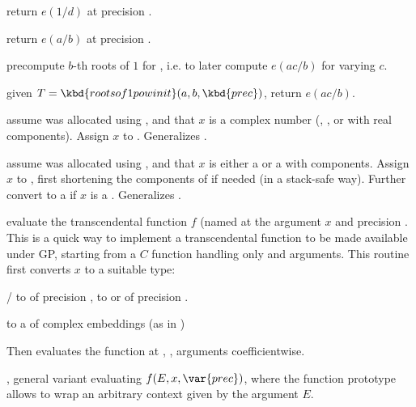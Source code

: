  return $e(1/d)$ at
precision .

 return $e(a/b)$ at
precision .

 precompute $b$-th
roots of $1$ for , i.e. to later compute $e(ac/b)$ for
varying $c$.

 given
$T = \kbd{rootsof1powinit}(a,b,\kbd{prec})$, return $e(ac/b)$.

 assume   was allocated
using , and that $x$ is a complex number (, ,
 or  with real components). Assign $x$ to .
Generalizes .

 assume  was allocated using
, and that $x$ is either a  or a 
with  components. Assign $x$ to , first shortening
the components of  if needed (in a stack-safe way). Further
convert  to a  if $x$ is a .
Generalizes .

evaluate the transcendental function $f$ (named  at the argument
$x$ and precision . This is a quick way to implement a transcendental
function to be made available under GP, starting from a $C$ function
handling only  and  arguments. This routine first
converts $x$ to a suitable type:

\item {}/ to  of precision ,  to
 or  of precision .

\item {} to a  of complex embeddings (as in )

Then evaluates the function at , ,  arguments
coefficientwise.

, general variant evaluating $f(E, x, \var{prec})$, where the
function prototype allows to wrap an arbitrary context given by the argument
$E$.


